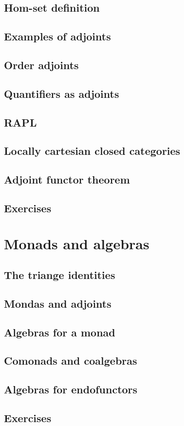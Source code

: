 \documentclass[uplatex, dvipdfmx]{jsarticle}
\begin{document}
\subsection{Hom-set definition}

\subsection{Examples of adjoints}

\subsection{Order adjoints}

\subsection{Quantifiers as adjoints}

\subsection{RAPL}

\subsection{Locally cartesian closed categories}

\subsection{Adjoint functor theorem}

\subsection{Exercises}

\section{Monads and algebras}

\subsection{The triange identities}

\subsection{Mondas and adjoints}

\subsection{Algebras for a monad}

\subsection{Comonads and coalgebras}

\subsection{Algebras for endofunctors}

\subsection{Exercises}
\end{document}
